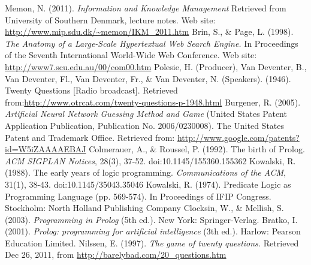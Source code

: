\documentclass[a4paper]{article}
\begin{document}
\begin{thebibliography}{10}
Memon, N. (2011). \textsl{Information and Knowledge Management} Retrieved from University of Southern Denmark, lecture notes. Web site: \url{http://www.mip.sdu.dk/~memon/IKM_2011.htm}
 Brin, S., \& Page, L. (1998). \textsl{The Anatomy of a Large-Scale Hypertextual Web Search Engine.} In Proceedings of the Seventh International World-Wide Web Conference. Web site: \url{http://www7.scu.edu.au/00/com00.htm}
Polesie, H. (Producer), Van Deventer, B., Van Deventer, Fl., Van Deventer, Fr., \& Van Deventer, N. (Speakers). (1946). Twenty Questions [Radio broadcast]. Retrieved from:\url{http://www.otrcat.com/twenty-questions-p-1948.html}
Burgener, R. (2005). \textsl{Artificial Neural Network Guessing Method and Game} (United States Patent Application Publication, Publication No. 2006/0230008). The United States Patent and Trademark Office. Retrieved from: \url{http://www.google.com/patents?id=W5iZAAAAEBAJ}
Colmerauer, A., \& Roussel, P. (1992). The birth of Prolog. \textsl{ACM SIGPLAN Notices}, 28(3), 37-52. doi:10.1145/155360.155362
Kowalski, R. (1988). The early years of logic programming. \textsl{Communications of the ACM}, 31(1), 38-43. doi:10.1145/35043.35046
Kowalski, R. (1974). Predicate Logic as Programming Language (pp. 569-574). In Proceedings of IFIP Congress. Stockholm: North Holland Publishing Company
Clocksin, W., \& Mellish, S. (2003). \textsl{Programming in Prolog} (5th ed.). New York: Springer-Verlag.
Bratko, I. (2001). \textsl{Prolog: programming for artificial intelligence} (3th ed.). Harlow: Pearson Education Limited.
Nilssen, E. (1997). \textsl{The game of twenty questions.} Retrieved Dec 26, 2011, from \url{http://barelybad.com/20_questions.htm}
\end{thebibliography}
\end{document}
